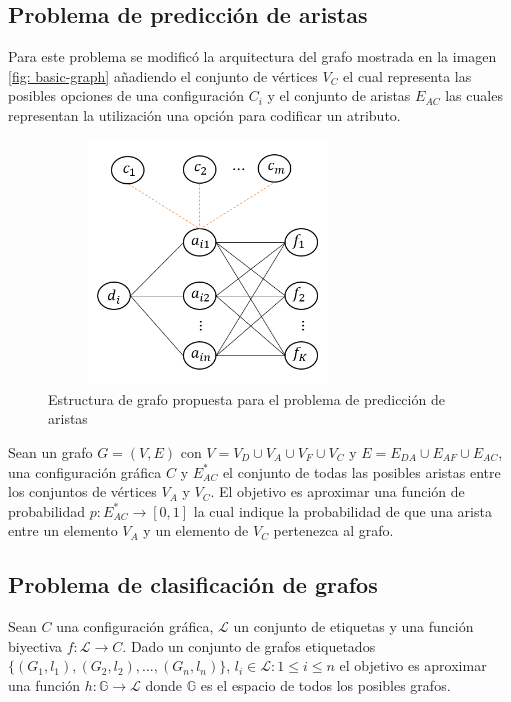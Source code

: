 \subsection{Problema de predicci\'on de aristas}

Para este problema se modific\'o la arquitectura del grafo mostrada en la imagen \ref{fig: basic-graph}
a\~nadiendo el conjunto de v\'ertices $V_C$ el cual representa las posibles opciones de una configuraci\'on $C_i$ y
el conjunto de aristas $E_{AC}$ las cuales representan la utilizaci\'on una opci\'on para codificar un atributo.

\begin{figure}[h!]
    \includegraphics[width=85mm, height=65mm]{Graphics/link_pred_graph.png}
    \caption{Estructura de grafo propuesta para el problema de predicci\'on de aristas}
    \label{fig: link-pred-graph}
\end{figure}

Sean un grafo $G = (V,E)$ con $V = V_D \cup V_A \cup V_F \cup V_C$ y $E = E_{DA} \cup E_{AF} \cup E_{AC}$,
una configuraci\'on gr\'afica $C$ y $E_{AC}^*$ el conjunto de todas las posibles aristas entre los conjuntos de v\'ertices $V_A$ y $V_C$.
El objetivo es aproximar una funci\'on de probabilidad $p : E_{AC}^* \to [0,1]$ la cual indique la probabilidad de que una arista
entre un elemento $V_A$ y un elemento de $V_C$ pertenezca al grafo.

\subsection{Problema de clasificaci\'on de grafos}

Sean $C$ una configuraci\'on gr\'afica, $\mathcal{L}$ un conjunto de etiquetas y
una funci\'on biyectiva $f : \mathcal{L} \to C$. Dado un conjunto
de grafos etiquetados $\{(G_1, l_1), (G_2, l_2),..., (G_n, l_n)\}$, $l_i \in \mathcal{L} : 1 \leq i \leq n$ 
el objetivo es aproximar una funci\'on $h : \mathbb{G} \to \mathcal{L}$ donde
$\mathbb{G}$ es el espacio de todos los posibles grafos.



